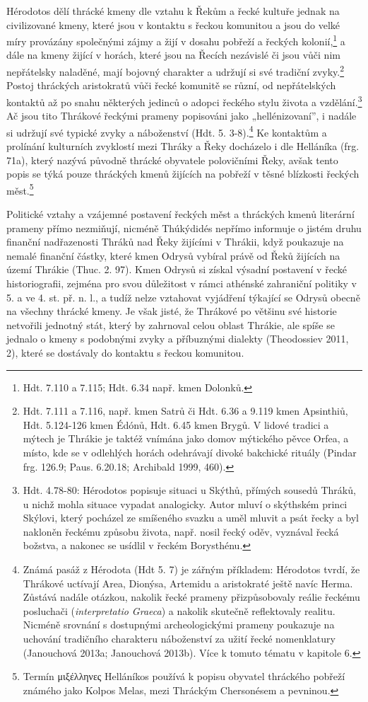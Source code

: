 Hérodotos dělí thrácké kmeny dle vztahu k Řekům a řecké kultuře jednak na civilizované kmeny, které jsou v kontaktu s řeckou komunitou a jsou do velké míry provázány společnými zájmy a žijí v dosahu pobřeží a řeckých kolonií,\footnote{Hdt. 7.110 a 7.115; Hdt. 6.34 např. kmen Dolonků.} a dále na kmeny žijící v horách, které jsou na Řecích nezávislé či jsou vůči nim nepřátelsky naladěné, mají bojovný charakter a udržují si své tradiční zvyky.\footnote{Hdt. 7.111 a 7.116, např. kmen Satrů či Hdt. 6.36 a 9.119 kmen Apsinthiů, Hdt. 5.124-126 kmen Édónů, Hdt. 6.45 kmen Brygů. V lidové tradici a mýtech je Thrákie je taktéž vnímána jako domov mýtického pěvce Orfea, a místo, kde se v odlehlých horách odehrávají divoké bakchické rituály (Pindar frg. 126.9; Paus. 6.20.18; Archibald 1999, 460).} Postoj thráckých aristokratů vůči řecké komunitě se různí, od nepřátelských kontaktů až po snahu některých jedinců o adopci řeckého stylu života a vzdělání.\footnote{Hdt. 4.78-80: Hérodotos popisuje situaci u Skýthů, přímých sousedů Thráků, u nichž mohla situace vypadat analogicky. Autor mluví o skýthském princi Skýlovi, který pocházel ze smíšeného svazku a uměl mluvit a psát řecky a byl nakloněn řeckému způsobu života, např. nosil řecký oděv, vyznával řecká božstva, a nakonec se usídlil v řeckém Borysthénu.} Ač jsou tito Thrákové řeckými prameny popisováni jako „hellénizovaní”, i nadále si udržují své typické zvyky a náboženství (Hdt. 5. 3-8).\footnote{Známá pasáž z Hérodota (Hdt 5. 7) je zářným příkladem: Hérodotos tvrdí, že Thrákové uctívají Area, Dionýsa, Artemidu a aristokraté ještě navíc Herma. Zůstává nadále otázkou, nakolik řecké prameny přizpůsobovaly reálie řeckému posluchači ({\em interpretatio Graeca}) a nakolik skutečně reflektovaly realitu. Nicméně srovnání s dostupnými archeologickými prameny poukazuje na uchování tradičního charakteru náboženství za užití řecké nomenklatury (Janouchová 2013a; Janouchová 2013b). Více k tomuto tématu v kapitole 6.} Ke kontaktům a prolínání kulturních zvyklostí mezi Thráky a Řeky docházelo i dle Helláníka (frg. 71a), který nazývá původně thrácké obyvatele polovičními Řeky, avšak tento popis se týká pouze thráckých kmenů žijících na pobřeží v těsné blízkosti řeckých měst.\footnote{Termín μιξέλληνες Helláníkos používá k popisu obyvatel thráckého pobřeží známého jako Kolpos Melas, mezi Thráckým Chersonésem a pevninou.}

Politické vztahy a vzájemné postavení řeckých měst a thráckých kmenů literární prameny přímo nezmiňují, nicméně Thúkýdidés nepřímo informuje o jistém druhu finanční nadřazenosti Thráků nad Řeky žijícími v Thrákii, když poukazuje na nemalé finanční částky, které kmen Odrysů vybíral právě od Řeků žijících na území Thrákie (Thuc. 2. 97). Kmen Odrysů si získal výsadní postavení v řecké historiografii, zejména pro svou důležitost v rámci athénské zahraniční politiky v 5. a ve 4. st. př. n. l., a tudíž nelze vztahovat vyjádření týkající se Odrysů obecně na všechny thrácké kmeny. Je však jisté, že Thrákové po většinu své historie netvořili jednotný stát, který by zahrnoval celou oblast Thrákie, ale spíše se jednalo o kmeny s podobnými zvyky a příbuznými dialekty (Theodossiev 2011, 2), které se dostávaly do kontaktu s řeckou komunitou.


